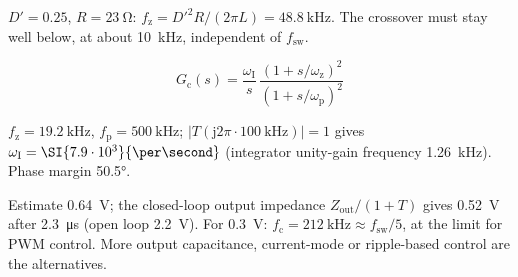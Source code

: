 \begin{solutionblock}
	$D'=0.25$, $R=\SI{23}{\ohm}$: $f_\mathrm{z}=D'^2R/(2\pi L)=\SI{48.8}{\kilo\hertz}$. The crossover must stay well below, at about \SI{10}{\kilo\hertz}, independent of $f_\mathrm{sw}$.
\end{solutionblock}



\begin{equation}
	G_\mathrm{c}(s)=\frac{\omega_\mathrm{I}}{s}\,\frac{(1+s/\omega_\mathrm{z})^2}{(1+s/\omega_\mathrm{p})^2}
\end{equation}


\begin{solutionblock}
	$f_\mathrm{z}=\SI{19.2}{\kilo\hertz}$, $f_\mathrm{p}=\SI{500}{\kilo\hertz}$; $|T(\mathrm{j}2\pi\cdot\SI{100}{\kilo\hertz})|=1$ gives $\omega_\mathrm{I}=\SI{7.9\cdot10^{3}}{\per\second}$ (integrator unity-gain frequency \SI{1.26}{\kilo\hertz}). Phase margin \ang{50.5}.
\end{solutionblock}


\begin{solutionblock}
	Estimate \SI{0.64}{\volt}; the closed-loop output impedance $Z_\mathrm{out}/(1+T)$ gives \SI{0.52}{\volt} after \SI{2.3}{\micro\second} (open loop \SI{2.2}{\volt}). For \SI{0.3}{\volt}: $f_\mathrm{c}=\SI{212}{\kilo\hertz}\approx f_\mathrm{sw}/5$, at the limit for PWM control. More output capacitance, current-mode or ripple-based control are the alternatives.
\end{solutionblock}




